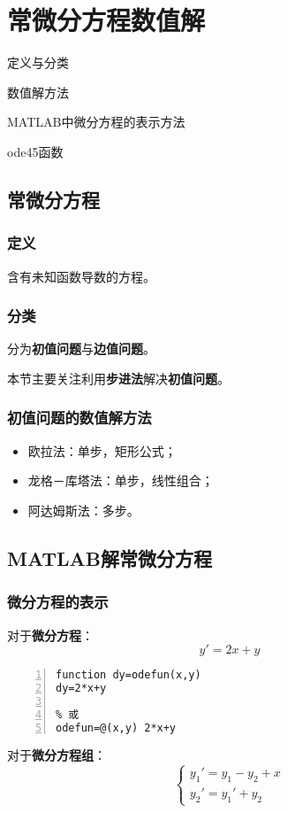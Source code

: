 \chapter{常微分方程数值解}
\begin{introduction}
\item 定义与分类
\item 数值解方法
\item MATLAB中微分方程的表示方法
\item ode45函数
\end{introduction}
\section{常微分方程}
\subsection{定义}
含有未知函数导数的方程。
\subsection{分类}
分为\textbf{初值问题}与\textbf{边值问题}。

本节主要关注利用\textbf{步进法}解决\textbf{初值问题}。
\subsection{初值问题的数值解方法}
\begin{itemize}
	\item 欧拉法：单步，矩形公式；
	\item 龙格－库塔法：单步，线性组合；
	\item 阿达姆斯法：多步。
\end{itemize}
\section{MATLAB解常微分方程}
\subsection{微分方程的表示}
对于\textcolor{third}{\textbf{微分方程}}：
\[y'=2x+y\]
\begin{lstlisting}[frame=single,numbers=left]
% 可表示为
function dy=odefun(x,y)
dy=2*x+y

% 或
odefun=@(x,y) 2*x+y
\end{lstlisting}

对于\textcolor{third}{\textbf{微分方程组}}：
\[
\begin{cases}
y_1'=y_1-y_2+x\\
y_2'=y_1'+y_2
\end{cases} \]

